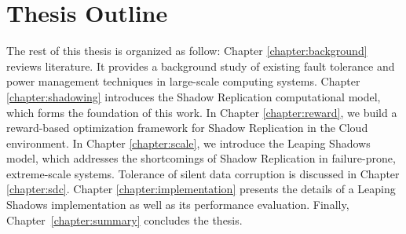 \section{Thesis Outline}
\label{outline}
The rest of this thesis is organized as follow:  
Chapter \ref{chapter:background} reviews literature. It provides a background study of existing fault tolerance and power management techniques in large-scale computing systems. 
Chapter \ref{chapter:shadowing} introduces the Shadow Replication computational model, which forms the foundation of this work. In Chapter \ref{chapter:reward}, we build a reward-based optimization framework for Shadow Replication in the Cloud environment.
In Chapter \ref{chapter:scale}, we introduce the Leaping Shadows model, which addresses the shortcomings of Shadow Replication in failure-prone, extreme-scale systems. 
Tolerance of silent data corruption is discussed in Chapter \ref{chapter:sdc}.
Chapter \ref{chapter:implementation} presents the details of a Leaping Shadows implementation as well as its performance evaluation. 
Finally, Chapter~\ref{chapter:summary}  concludes the thesis.








